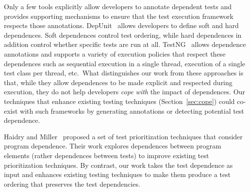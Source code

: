 Only a few tools explicitly 
allow developers to annotate dependent tests and
provides supporting mechanisms to ensure that the test execution framework
respects those annotations.  DepUnit~\cite{depunit}
allows developers to define soft and hard dependences. Soft dependences control
test ordering, while hard dependences in addition control whether specific tests are
run at all.  TestNG~\cite{testng} 
allows dependence annotations and supports a variety of execution policies
that respect these dependences
such as sequential execution
in a single thread, execution of a single test class per thread, etc.\
What distinguishes our work from these approaches is that, while they allow dependences
to be made explicit and respected during execution, they do not help developers
\emph{cope with} the impact of dependences.  Our techniques that
enhance existing testing techniques
(Section~\ref{sec:cope}) could co-exist
with such frameworks by generating annotations or detecting potential
test dependence.

Haidry and Miller~\cite{10.1109/TSE.2012.26} proposed a set of
test prioritization techniques that consider
program dependence.  
Their work explores dependences between program elements (rather
dependences between tests)
to improve existing test prioritization techniques.
By contrast, our work takes the test dependence as input
and enhances existing testing techniques to make them
produce a test ordering that preserves the test dependencies.



